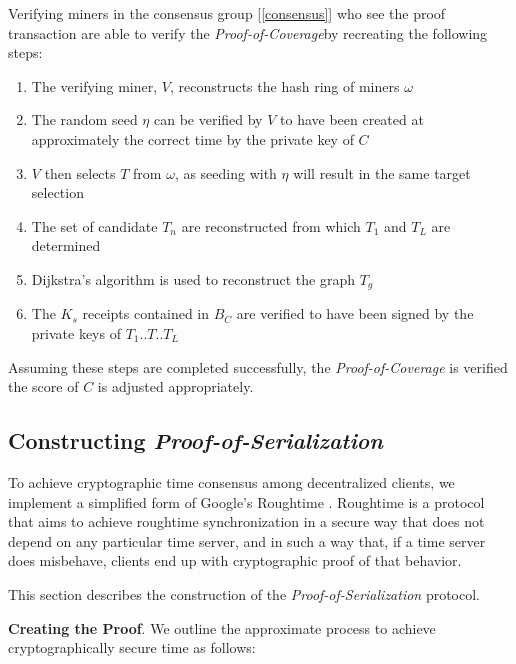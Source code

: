 \documentclass[UTF8, 10pt, nonatbib, nocopyrightspace, reprint]{sigplanconf}
\newcommand{\secref}[1]{[\autoref{#1}]}
\begin{document}
Verifying miners in the consensus group \secref{consensus} who see the proof transaction are able to verify the \emph{Proof-of-Coverage}by recreating the following steps:

\begin{enumerate}
        \item The verifying miner, $V$, reconstructs the hash ring of miners $\omega$
        \item The random seed $\eta$ can be verified by $V$ to have been created at approximately the correct time by the private key of $C$
        \item $V$ then selects $T$ from $\omega$, as seeding with $\eta$ will result in the same target selection
        \item The set of candidate $T_n$ are reconstructed from which $T_1$ and $T_L$ are determined
        \item Dijkstra's algorithm is used to reconstruct the graph $T_g$
        \item The $K_s$ receipts contained in $B_C$ are verified to have been signed by the private keys of $T_1$..$T$..$T_L$
\end{enumerate}

Assuming these steps are completed successfully, the \emph{Proof-of-Coverage} is verified the score of $C$ is adjusted appropriately.

\subsection{Constructing \emph{Proof-of-Serialization}}

To achieve cryptographic time consensus among decentralized clients, we implement a simplified form of Google's Roughtime \cite{roughtime}. Roughtime is a protocol that aims to achieve roughtime synchronization in a secure way that does not depend on any particular time server, and in such a way that, if a time server does misbehave, clients end up with cryptographic proof of that behavior.

This section describes the construction of the \emph{Proof-of-Serialization} protocol.

\textbf{Creating the Proof}. We outline the approximate process to achieve cryptographically secure time as follows:
\end{document}
